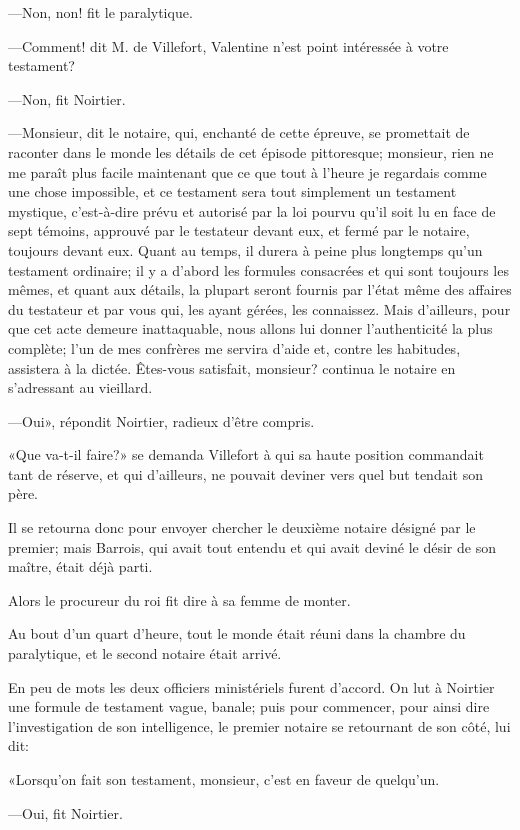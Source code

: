 —Non, non! fit le paralytique. 

—Comment! dit M. de Villefort, Valentine n'est point intéressée à votre testament? 

—Non, fit Noirtier. 

—Monsieur, dit le notaire, qui, enchanté de cette épreuve, se promettait de raconter dans le monde les détails de cet épisode pittoresque; monsieur, rien ne me paraît plus facile maintenant que ce que tout à l'heure je regardais comme une chose impossible, et ce testament sera tout simplement un testament mystique, c'est-à-dire prévu et autorisé par la loi pourvu qu'il soit lu en face de sept témoins, approuvé par le testateur devant eux, et fermé par le notaire, toujours devant eux. Quant au temps, il durera à peine plus longtemps qu'un testament ordinaire; il y a d'abord les formules consacrées et qui sont toujours les mêmes, et quant aux détails, la plupart seront fournis par l'état même des affaires du testateur et par vous qui, les ayant gérées, les connaissez. Mais d'ailleurs, pour que cet acte demeure inattaquable, nous allons lui donner l'authenticité la plus complète; l'un de mes confrères me servira d'aide et, contre les habitudes, assistera à la dictée. Êtes-vous satisfait, monsieur? continua le notaire en s'adressant au vieillard. 

—Oui», répondit Noirtier, radieux d'être compris. 

«Que va-t-il faire?» se demanda Villefort à qui sa haute position commandait tant de réserve, et qui d'ailleurs, ne pouvait deviner vers quel but tendait son père. 

Il se retourna donc pour envoyer chercher le deuxième notaire désigné par le premier; mais Barrois, qui avait tout entendu et qui avait deviné le désir de son maître, était déjà parti. 

Alors le procureur du roi fit dire à sa femme de monter. 

Au bout d'un quart d'heure, tout le monde était réuni dans la chambre du paralytique, et le second notaire était arrivé. 

En peu de mots les deux officiers ministériels furent d'accord. On lut à Noirtier une formule de testament vague, banale; puis pour commencer, pour ainsi dire l'investigation de son intelligence, le premier notaire se retournant de son côté, lui dit: 

«Lorsqu'on fait son testament, monsieur, c'est en faveur de quelqu'un. 

—Oui, fit Noirtier.  


